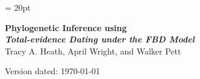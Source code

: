 \documentclass[11pt]{article}
\begin{document}
\renewcommand{\headrulewidth}{0.5pt}
\headsep = 20pt
\lhead{ }

\thispagestyle{plain}
\begin{center}

\textbf{\LARGE Phylogenetic Inference using \RevBayes}\\\vspace{2mm}
\textbf{\it{\Large Total-evidence Dating under the FBD Model}}\\\vspace{2mm}
\vspace{1cm}
{\Large Tracy A. Heath, April Wright, and Walker Pett}
\vspace{1cm}
\end{center}

\def \ResourcePath {./}
\def \GlobalResourcePath {../}


Version dated: \today
\end{document}
